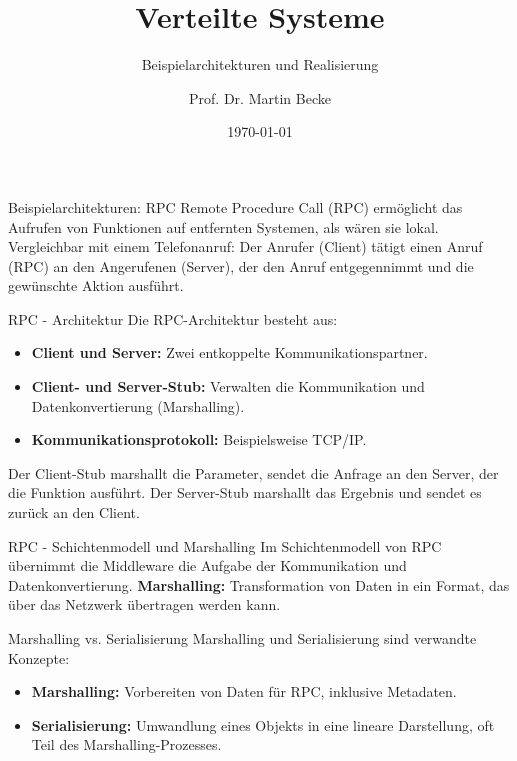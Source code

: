 \documentclass{beamer}
\title{Verteilte Systeme}
\subtitle{Beispielarchitekturen und Realisierung}
\author{Prof. Dr. Martin Becke}
\date{\today}
\begin{document}
\begin{frame}
    \titlepage
\end{frame}

\begin{frame}{Beispielarchitekturen: RPC}
    Remote Procedure Call (RPC) ermöglicht das Aufrufen von Funktionen auf entfernten Systemen, als wären sie lokal. 
    Vergleichbar mit einem Telefonanruf: Der Anrufer (Client) tätigt einen Anruf (RPC) an den Angerufenen (Server), der den Anruf entgegennimmt und die gewünschte Aktion ausführt.
\end{frame}

\begin{frame}{RPC - Architektur}
    Die RPC-Architektur besteht aus:
    \begin{itemize}
        \item \textbf{Client und Server:} Zwei entkoppelte Kommunikationspartner.
        \item \textbf{Client- und Server-Stub:} Verwalten die Kommunikation und Datenkonvertierung (Marshalling).
        \item \textbf{Kommunikationsprotokoll:} Beispielsweise TCP/IP.
    \end{itemize}

    Der Client-Stub marshallt die Parameter, sendet die Anfrage an den Server, der die Funktion ausführt. Der Server-Stub marshallt das Ergebnis und sendet es zurück an den Client.
\end{frame}

\begin{frame}{RPC - Schichtenmodell und Marshalling}
    Im Schichtenmodell von RPC übernimmt die Middleware die Aufgabe der Kommunikation und Datenkonvertierung. \newline
    \textbf{Marshalling:} Transformation von Daten in ein Format, das über das Netzwerk übertragen werden kann.
\end{frame}

\begin{frame}{Marshalling vs. Serialisierung}
    Marshalling und Serialisierung sind verwandte Konzepte:
    \begin{itemize}
        \item \textbf{Marshalling:} Vorbereiten von Daten für RPC, inklusive Metadaten.
        \item \textbf{Serialisierung:} Umwandlung eines Objekts in eine lineare Darstellung, oft Teil des Marshalling-Prozesses.
    \end{itemize}
\end{frame}
\end{document}
